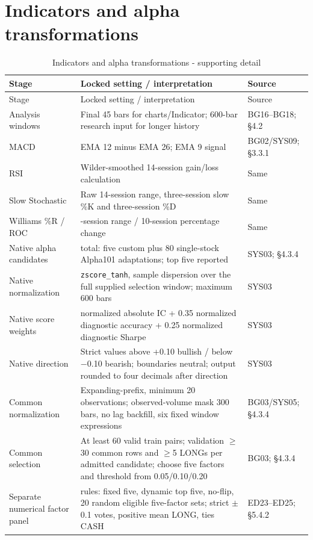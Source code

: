 \section{Indicators and alpha transformations}\label{s:753bf836f7fb94ac}

\begingroup
\small
{}
\setlength{\tabcolsep}{3pt}

\begin{longtable}[]{@{}
  >{\raggedright\arraybackslash}p{}
  >{\raggedright\arraybackslash}p{}
  >{\raggedright\arraybackslash}p{}@{}}
\caption{Indicators and alpha transformations - supporting detail}\label{tab:C_configuration:2}\tabularnewline
\toprule\noalign{}
Stage
 & Locked setting / interpretation
 & Source
 \\
\midrule\noalign{}
\endfirsthead
\toprule\noalign{}
Stage
 & Locked setting / interpretation
 & Source
 \\
\midrule\noalign{}
\endhead
\bottomrule\noalign{}
\endlastfoot
Analysis windows & Final 45 bars for charts/Indicator; 600-bar research input for longer history & BG16--BG18; §4.2 \\
MACD & EMA 12 minus EMA 26; EMA 9 signal & BG02/SYS09; §3.3.1 \\
RSI & Wilder-smoothed 14-session gain/loss calculation & Same \\
Slow Stochastic & Raw 14-session range, three-session slow \%K and three-session \%D & Same \\
Williams \%R / ROC & 14-session range / 10-session percentage change & Same \\
Native alpha candidates & 85 total: five custom plus 80 single-stock Alpha101 adaptations; top five reported & SYS03; §4.3.4 \\
Native normalization & \texttt{zscore\_\allowbreak{}tanh}, sample dispersion over the full supplied selection window; maximum 600 bars & SYS03 \\
Native score weights & 0.40 normalized absolute IC + 0.35 normalized diagnostic accuracy + 0.25 normalized diagnostic Sharpe & SYS03 \\
Native direction & Strict values above +0.10 bullish / below \ensuremath{-}0.10 bearish; boundaries neutral; output rounded to four decimals after direction & SYS03 \\
Common normalization & Expanding-prefix, minimum 20 observations; observed-volume mask 300 bars, no lag backfill, six fixed window expressions & BG03/SYS05; §4.3.4 \\
Common selection & At least 60 valid train pairs; validation \ensuremath{\geq}30 common rows and \ensuremath{\geq}5 LONGs per admitted candidate; choose five factors and threshold from 0.05/0.10/0.20 & BG03; §4.3.4 \\
Separate numerical factor panel & 23 rules: fixed five, dynamic top five, no-flip, 20 random eligible five-factor sets; strict \ensuremath{\pm}0.1 votes, positive mean LONG, ties CASH & ED23--ED25; §5.4.2 \\
\end{longtable}

